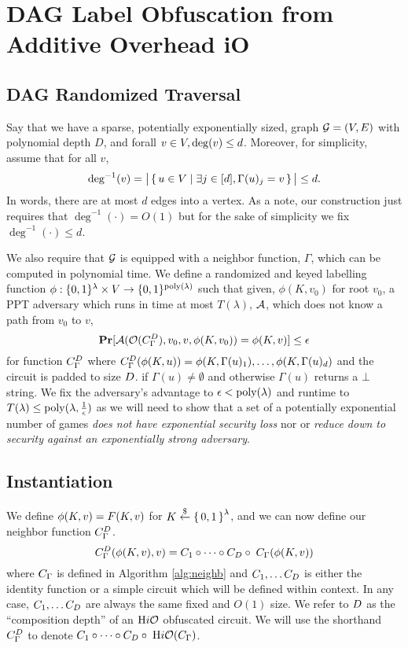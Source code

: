 \section{DAG Label Obfuscation from Additive Overhead iO}
\subsection{DAG Randomized Traversal}
Say that we have a sparse, potentially exponentially sized, graph $\mathcal{G} = (V, E)$ with polynomial depth $D$,
and forall $v \in V, \deg(v) \leq d$. Moreover, for simplicity,
assume that for all $v$, 
$$
\deg^{-1}(v) = \big|\set{u \in V \mid \exists j \in [d], \Gamma(u)_j = v}\big| \leq d.
$$
In words, there are at most $d$ edges into a vertex. As a note, our construction just requires
that $\deg^{-1}(\cdot) = O(1)$ but for the sake of simplicity we fix $\deg^{-1}(\cdot) \leq d$.

We also require that $\mathcal{G}$ is equipped with a neighbor function, $\Gamma$, which can be computed in polynomial time.
We define a randomized and keyed labelling function $\phi: \{0,1\}^\lambda \times V \rightarrow \{0,1\}^{\operatorname{poly}(\lambda)}$ 
such that given, $\phi(K, v_0)$ for root $v_0$, a PPT adversary which runs in time at most $T(\lambda)$, $\mathcal{A}$, which does not know a path from $v_0$ to $v$,
\begin{equation}
	\label{eq:guessPhi}
	\operatorname*{\mathbf{Pr}}[\mathcal{A}(\mathcal{O}({C_\Gamma^D}), v_0, v, \phi(K, v_0)) = \phi(K, v)] \leq \epsilon
\end{equation}
for function ${C_\Gamma^D}$ where ${C_\Gamma^D}(\phi(K, u)) = \phi(K, \Gamma(u)_1), \dots, \phi(K, \Gamma(u)_d)$ and the circuit is padded to size $D$.
if $\Gamma(u) \neq \emptyset$ and otherwise $\Gamma(u)$ returns a $\bot$ string.
We fix the adversary's advantage to $\epsilon < \operatorname{poly}(\lambda)$ and runtime to $T(\lambda) \leq \operatorname{poly}(\lambda, \frac{1}{\epsilon})$
as we will need to show
that a set of a potentially exponential number of games \emph{does not have exponential security loss}
nor or \emph{reduce down to security against an exponentially strong adversary}.

\subsection{Instantiation}
We define 
$
	\phi(K, v) = F(K, v)
$ for $K \overset{\$}{\gets} \set{0, 1}^\lambda$, and we can now define our neighbor function ${C_\Gamma^D}$.
\begin{equation}
	\label{eq:neighbfn}
	{C_\Gamma^D}(\phi(K, v), v) = C_1\circ\cdots \circ C_D \circ \; C_\Gamma(\phi(K, v))
\end{equation}
where $C_\Gamma$ is defined in Algorithm \ref{alg:neighb} and $C_1, \dots C_D$ is 
either the identity function or a simple circuit which 
will be defined within context. In any case, $C_1, \dots C_D$ are always the same fixed and $O(1)$ size.
We refer to $D$ as the ``composition depth'' of an $\text{H}i\mathcal{O}$ obfuscated circuit.
We will use the shorthand ${C_\Gamma^D}$ to denote 
$ C_1 \circ \cdots \circ C_D \circ \; \text{H}i\mathcal{O}(C_\Gamma)$.

